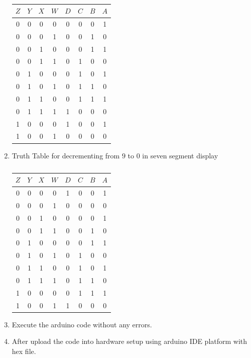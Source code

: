\documentclass[conference]{IEEEtran}
\begin{document}
\begin{enumerate}
\begin{table}[htbp]
    \centering
\begin{tabular}
{ | c | c | c | c | c | c | c | c | } \hline
$Z$ & $Y$ & $X$ & $W$ & $D$ & $C$ & $B$ & $A$\\\hline
0   & 0   & 0   & 0   & 0  & 0 & 0  & 1 \\
0   & 0   & 0   & 1   & 0  & 0 & 1  & 0 \\
0   & 0   & 1   & 0   & 0  & 0 & 1  & 1 \\
0   & 0   & 1   & 1   & 0  & 1 & 0  & 0 \\
0   & 1   & 0   & 0   & 0  & 1 & 0  & 1 \\  
0   & 1   & 0   & 1   & 0  & 1 & 1  & 0 \\
0   & 1   & 1   & 0   & 0  & 1 & 1  & 1 \\  
0   & 1   & 1   & 1   & 1  & 0 & 0  & 0 \\
1   & 0   & 0   & 0   & 1  & 0 & 0  & 1 \\
1   & 0   & 0   & 1   & 0  & 0 & 0  & 0 \\ \hline
\end{tabular}
\vspace{0.15cm}
\caption{\label{tab:widgets}}
\end{table}

\item {Truth Table for decrementing from $9$ to $0$ in seven segment display }

\begin{table}[htbp]
    \centering
\begin{tabular}
{ | c | c | c | c | c | c | c | c | } \hline
$Z$ & $Y$ & $X$ & $W$ & $D$ & $C$ & $B$ & $A$\\\hline
0   & 0   & 0   & 0   & 1  & 0 & 0  & 1 \\
0   & 0   & 0   & 1   & 0  & 0 & 0  & 0 \\
0   & 0   & 1   & 0   & 0  & 0 & 0  & 1 \\
0   & 0   & 1   & 1   & 0  & 0 & 1  & 0 \\
0   & 1   & 0   & 0   & 0  & 0 & 1  & 1 \\  
0   & 1   & 0   & 1   & 0  & 1 & 0  & 0 \\
0   & 1   & 1   & 0   & 0  & 1 & 0  & 1 \\  
0   & 1   & 1   & 1   & 0  & 1 & 1  & 0 \\
1   & 0   & 0   & 0   & 0  & 1 & 1  & 1 \\
1   & 0   & 0   & 1   & 1  & 0 & 0  & 0 \\ \hline
\end{tabular}
\vspace{0.15cm}
\caption{\label{tab:widgets}}
\end{table}
	
\item Execute the arduino code without any errors.
\item After upload the code into hardware setup using arduino IDE platform with hex file.
 \end{enumerate}
\end{document}
